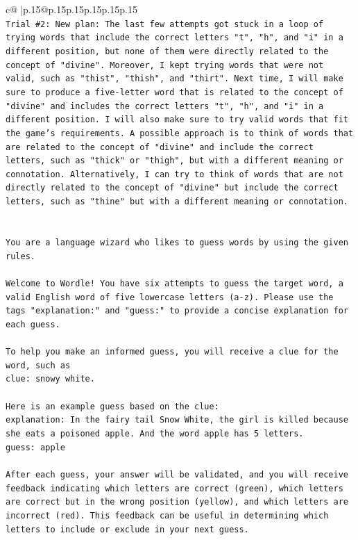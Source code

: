 \documentclass{article}
\begin{document}
{\begin{supertabular}{c@{$\;$}|p{.15\linewidth}@{}p{.15\linewidth}p{.15\linewidth}p{.15\linewidth}p{.15\linewidth}p{.15\linewidth}}
{{{\\ 
\texttt{Trial \#2: New plan: The last few attempts got stuck in a loop of trying words that include the correct letters "t", "h", and "i" in a different position, but none of them were directly related to the concept of "divine". Moreover, I kept trying words that were not valid, such as "thist", "thish", and "thirt". Next time, I will make sure to produce a five{-}letter word that is related to the concept of "divine" and includes the correct letters "t", "h", and "i" in a different position. I will also make sure to try valid words that fit the game's requirements. A possible approach is to think of words that are related to the concept of "divine" and include the correct letters, such as "thick" or "thigh", but with a different meaning or connotation. Alternatively, I can try to think of words that are not directly related to the concept of "divine" but include the correct letters, such as "thine" but with a different meaning or connotation.} \\
\\ 
\\ 
\texttt{You are a language wizard who likes to guess words by using the given rules.} \\
\\ 
\texttt{Welcome to Wordle! You have six attempts to guess the target word, a valid English word of five lowercase letters (a{-}z). Please use the tags "explanation:" and "guess:" to provide a concise explanation for each guess.} \\
\\ 
\texttt{To help you make an informed guess, you will receive a clue for the word, such as} \\
\texttt{clue: snowy white.} \\
\\ 
\texttt{Here is an example guess based on the clue:} \\
\texttt{explanation: In the fairy tail Snow White, the girl is killed because she eats a poisoned apple. And the word apple has 5 letters.} \\
\texttt{guess: apple} \\
\\ 
\texttt{After each guess, your answer will be validated, and you will receive feedback indicating which letters are correct (green), which letters are correct but in the wrong position (yellow), and which letters are incorrect (red). This feedback can be useful in determining which letters to include or exclude in your next guess.} \\
}}}
\end{supertabular}}
\end{document}
